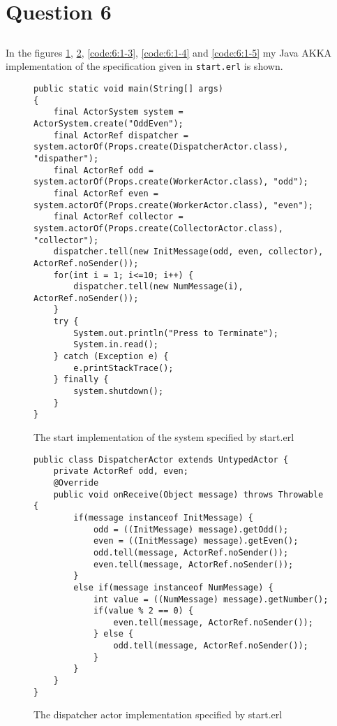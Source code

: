 \section{Question 6}
\subsection{}
In the figures \ref{code:6:1-1}, \ref{code:6:1-2}, \ref{code:6:1-3}, \ref{code:6:1-4} and \ref{code:6:1-5} my Java AKKA implementation of the specification given in \texttt{start.erl} is shown.

\begin{figure}
\begin{lstlisting}
public static void main(String[] args)
{
    final ActorSystem system = ActorSystem.create("OddEven");
    final ActorRef dispatcher = system.actorOf(Props.create(DispatcherActor.class), "dispather");
    final ActorRef odd = system.actorOf(Props.create(WorkerActor.class), "odd");
    final ActorRef even = system.actorOf(Props.create(WorkerActor.class), "even");
    final ActorRef collector = system.actorOf(Props.create(CollectorActor.class), "collector");
    dispatcher.tell(new InitMessage(odd, even, collector), ActorRef.noSender());
    for(int i = 1; i<=10; i++) {
        dispatcher.tell(new NumMessage(i), ActorRef.noSender());
    }
    try {
        System.out.println("Press to Terminate");
        System.in.read();
    } catch (Exception e) {
        e.printStackTrace();
    } finally {
        system.shutdown();
    }
}
\end{lstlisting}
\caption{The start implementation of the system specified by start.erl}
\label{code:6:1-1}
\end{figure}


\begin{figure}
\begin{lstlisting}
public class DispatcherActor extends UntypedActor {
    private ActorRef odd, even;
    @Override
    public void onReceive(Object message) throws Throwable {
        if(message instanceof InitMessage) {
            odd = ((InitMessage) message).getOdd();
            even = ((InitMessage) message).getEven();
            odd.tell(message, ActorRef.noSender());
            even.tell(message, ActorRef.noSender());
        }
        else if(message instanceof NumMessage) {
            int value = ((NumMessage) message).getNumber();
            if(value % 2 == 0) {
                even.tell(message, ActorRef.noSender());
            } else {
                odd.tell(message, ActorRef.noSender());
            }
        }
    }
}
\end{lstlisting}
\caption{The dispatcher actor implementation specified by start.erl}
\label{code:6:1-2}
\end{figure}


